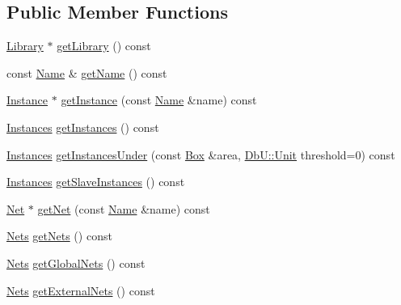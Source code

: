 \subsection*{Public Member Functions}
\begin{DoxyCompactItemize}
\item 
\mbox{\hyperlink{classHurricane_1_1Library}{Library}} $\ast$ \mbox{\hyperlink{classHurricane_1_1Cell_aa84b97773160a28d3dd69df1e261eecf}{get\+Library}} () const
\item 
const \mbox{\hyperlink{classHurricane_1_1Name}{Name}} \& \mbox{\hyperlink{classHurricane_1_1Cell_a01cd4bba972d484496fd297648b8fa0c}{get\+Name}} () const
\item 
\mbox{\hyperlink{classHurricane_1_1Instance}{Instance}} $\ast$ \mbox{\hyperlink{classHurricane_1_1Cell_abaf178b24734de37cf0ac31918c096ac}{get\+Instance}} (const \mbox{\hyperlink{classHurricane_1_1Name}{Name}} \&name) const
\item 
\mbox{\hyperlink{namespaceHurricane_ac9436b03a2926f34ad6863deae2baadc}{Instances}} \mbox{\hyperlink{classHurricane_1_1Cell_aa85b3992431b672827167c5d9cb622f2}{get\+Instances}} () const
\item 
\mbox{\hyperlink{namespaceHurricane_ac9436b03a2926f34ad6863deae2baadc}{Instances}} \mbox{\hyperlink{classHurricane_1_1Cell_a3af933175d318b205d94adaf92ba0499}{get\+Instances\+Under}} (const \mbox{\hyperlink{classHurricane_1_1Box}{Box}} \&area, \mbox{\hyperlink{group__DbUGroup_ga4fbfa3e8c89347af76c9628ea06c4146}{Db\+U\+::\+Unit}} threshold=0) const
\item 
\mbox{\hyperlink{namespaceHurricane_ac9436b03a2926f34ad6863deae2baadc}{Instances}} \mbox{\hyperlink{classHurricane_1_1Cell_a7e51bee5db73dd44f788e591a5c175c8}{get\+Slave\+Instances}} () const
\item 
\mbox{\hyperlink{classHurricane_1_1Net}{Net}} $\ast$ \mbox{\hyperlink{classHurricane_1_1Cell_a63cb19881279b5af0a4e7dae707ef1bd}{get\+Net}} (const \mbox{\hyperlink{classHurricane_1_1Name}{Name}} \&name) const
\item 
\mbox{\hyperlink{namespaceHurricane_a3404a8b17130a1824f4a281704b04df7}{Nets}} \mbox{\hyperlink{classHurricane_1_1Cell_a8b4728abe83e9ec21d7bee1154218279}{get\+Nets}} () const
\item 
\mbox{\hyperlink{namespaceHurricane_a3404a8b17130a1824f4a281704b04df7}{Nets}} \mbox{\hyperlink{classHurricane_1_1Cell_a1512722d821edc18ff38e673862cd108}{get\+Global\+Nets}} () const
\item 
\mbox{\hyperlink{namespaceHurricane_a3404a8b17130a1824f4a281704b04df7}{Nets}} \mbox{\hyperlink{classHurricane_1_1Cell_aa80f3345db8c1395fa04a50737208793}{get\+External\+Nets}} () const

\end{DoxyCompactItemize}
